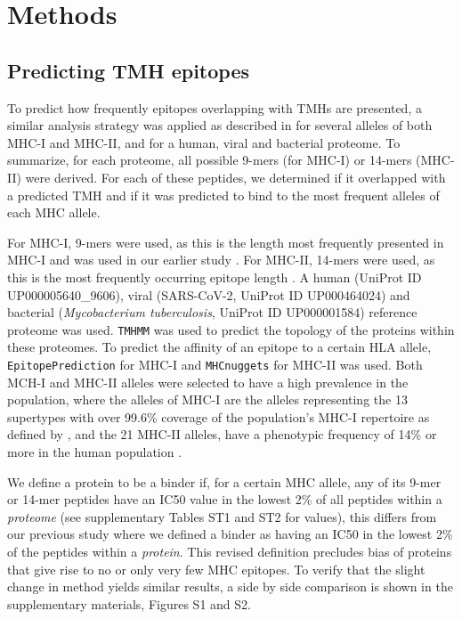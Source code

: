 \documentclass[utf8]{frontiersSCNS} %
\begin{document}
\section{Methods}

\subsection{Predicting TMH epitopes}

To predict how frequently epitopes overlapping with TMHs are presented,
a similar analysis strategy was applied as described in \citep{bianchi2017} 
for several alleles of both MHC-I and MHC-II, 
and for a human, viral and bacterial proteome.
To summarize, for each proteome, 
all possible 9-mers (for MHC-I) or 14-mers (MHC-II) were derived. 
For each of these peptides, we determined if it overlapped with a predicted 
TMH and if it was predicted to bind to the most frequent alleles of each MHC allele.

For MHC-I, 9-mers were used, 
as this is the length most frequently presented in MHC-I 
and was used in our earlier study \citep{bianchi2017}. 
For MHC-II, 14-mers were used, 
as this is the most frequently occurring epitope length \citep{bergseng2015different}.
A human (UniProt ID UP000005640\_9606), 
viral (SARS-CoV-2, UniProt ID UP000464024) 
and bacterial (\emph{Mycobacterium tuberculosis}, UniProt ID UP000001584) 
reference proteome was used. 
\verb;TMHMM; \citep{krogh2001predicting} was used to predict the topology 
of the proteins within these proteomes.
To predict the affinity of an epitope to a certain HLA allele,
 \verb;EpitopePrediction; \citep{bianchi2017} for MHC-I 
and \verb;MHCnuggets; \citep{shao2020high} for MHC-II was used.
Both MCH-I and MHC-II alleles were selected 
to have a high prevalence in the population,
where the alleles of MHC-I are the alleles representing the 13 supertypes 
with over 99.6\% coverage of the population's MHC-I repertoire as defined by \citep{lund2004definition} \citep{sette1999},
and the 21 MHC-II alleles, have a phenotypic frequency 
of 14\% or more in the human population \citep{greenbaum2011functional}.
 
We define a protein to be a binder if, for a certain MHC allele, 
any of its 9-mer or 14-mer peptides have an IC50 value in the lowest 2\% of 
all peptides within a \emph{proteome} 
(see supplementary Tables ST1 and ST2 for values), 
this differs from our previous study where we defined
a binder as having an IC50 in the lowest 2\% 
of the peptides within a \emph{protein}.
This revised definition precludes bias of proteins 
that give rise to no or only very few MHC epitopes.
To verify that the slight change in method yields similar results,
a side by side comparison is shown in the supplementary materials, 
Figures S1 and S2.
\end{document}
